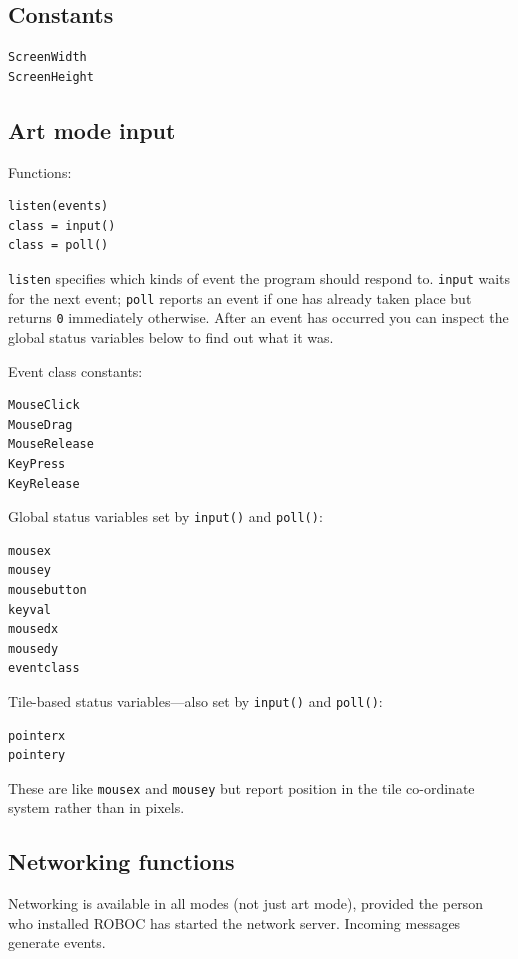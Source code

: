 \documentclass[12pt,a4paper,twoside]{article}
\renewcommand{\_}{\texttt{\symbol{95}}}
\begin{document}
\subsection{Constants}

\begin{verbatim}
ScreenWidth
ScreenHeight
\end{verbatim}

\subsection{Art mode input}

Functions:

\begin{verbatim}
listen(events)
class = input()
class = poll()
\end{verbatim}

\verb^listen^ specifies which kinds of event the program should respond to.
\verb^input^ waits for the next event; \verb^poll^ reports an event
if one has already taken place but returns \verb^0^ immediately otherwise.
After an event has occurred you can inspect the global status variables
below to find out what it was.

Event class constants:

\begin{verbatim}
MouseClick
MouseDrag
MouseRelease
KeyPress
KeyRelease
\end{verbatim}

Global status variables set by \verb^input()^ and \verb^poll()^:

\begin{verbatim}
mousex
mousey
mousebutton
keyval
mousedx
mousedy
eventclass
\end{verbatim}

Tile-based status variables---also set by \verb^input()^ and \verb^poll()^:

\begin{verbatim}
pointerx
pointery
\end{verbatim}

These are like \verb^mousex^ and \verb^mousey^ but report position in
the tile co-ordinate system rather than in pixels.

\subsection{Networking functions} \label{sec:networking-functions}

Networking is available in all modes (not just art mode), provided the
person who installed ROBOC has started the network server.
Incoming messages generate events.
\end{document}
